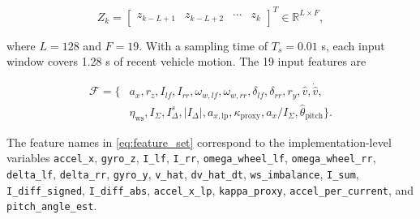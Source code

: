 \documentclass[twocolumn]{article}
\begin{document}
\begin{equation}
Z_k =
\begin{bmatrix}
z_{k-L+1} & z_{k-L+2} & \cdots & z_k
\end{bmatrix}^{T}
\in \mathbb{R}^{L \times F},
\label{eq:input_window}
\end{equation}

where $L=128$ and $F=19$. With a sampling time of $T_s=0.01$ s, each input window covers 1.28 s of recent vehicle motion. The 19 input features are

\begin{equation}
\begin{aligned}
\mathcal{F}=\{&
a_x, r_z, I_{lf}, I_{rr}, \omega_{w,lf}, \omega_{w,rr},
\delta_{lf}, \delta_{rr}, r_y, \hat{v}, \dot{\hat{v}},\\
& \eta_{\mathrm{ws}}, I_{\Sigma}, I_{\Delta}^{s}, |I_{\Delta}|,
a_{x,\mathrm{lp}}, \kappa_{\mathrm{proxy}},
a_x/I_{\Sigma}, \hat{\theta}_{\mathrm{pitch}}\}.
\end{aligned}
\label{eq:feature_set}
\end{equation}

The feature names in \eqref{eq:feature_set} correspond to the implementation-level variables \texttt{accel\_x}, \texttt{gyro\_z}, \texttt{I\_lf}, \texttt{I\_rr}, \texttt{omega\_wheel\_lf}, \texttt{omega\_wheel\_rr}, \texttt{delta\_lf}, \texttt{delta\_rr}, \texttt{gyro\_y}, \texttt{v\_hat}, \texttt{dv\_hat\_dt}, \texttt{ws\_imbalance}, \texttt{I\_sum}, \texttt{I\_diff\_signed}, \texttt{I\_diff\_abs}, \texttt{accel\_x\_lp}, \texttt{kappa\_proxy}, \texttt{accel\_per\_current}, and \texttt{pitch\_angle\_est}.
\end{document}
